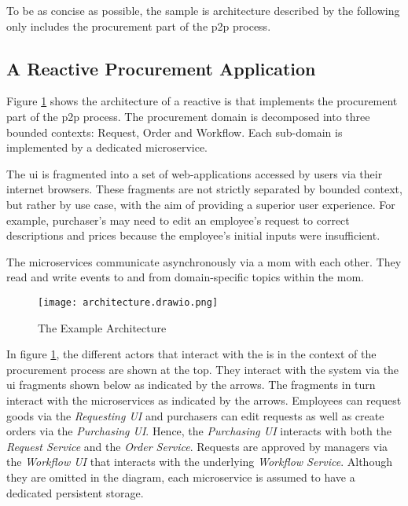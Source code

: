 To be as concise as possible, the sample \gls{is} architecture described by the following only includes the procurement part of the \gls{p2p} process.

\subsection{A Reactive Procurement Application}

Figure \ref{fig:example-architecture} shows the architecture of a reactive \gls{is} that implements the procurement part of the \gls{p2p} process.
The procurement domain is decomposed into three bounded contexts: Request, Order and Workflow.
Each sub-domain is implemented by a dedicated microservice.

The \gls{ui} is fragmented into a set of web-applications accessed by users via their internet browsers.
These fragments are not strictly separated by bounded context, but rather by use case, with the aim of providing a superior user experience.
For example, purchaser's may need to edit an employee's request to correct descriptions and prices because the employee's initial inputs were insufficient.

The microservices communicate asynchronously via a \gls{mom} with each other.
They read and write events to and from domain-specific topics within the \gls{mom}.

\begin{figure}[H]
  \centering
  \texttt{[image: architecture.drawio.png]}
  \caption{The Example Architecture}\label{fig:example-architecture}
\end{figure}

In figure \ref{fig:example-architecture}, the different actors that interact with the \gls{is} in the context of the procurement process are shown at the top.
They interact with the system via the \gls{ui} fragments shown below as indicated by the arrows.
The fragments in turn interact with the microservices as indicated by the arrows.
Employees can request goods via the \emph{Requesting UI} and purchasers can edit requests as well as create orders via the \emph{Purchasing UI}.
Hence, the \emph{Purchasing UI} interacts with both the \emph{Request Service} and the \emph{Order Service}.
Requests are approved by managers via the \emph{Workflow UI} that interacts with the underlying \emph{Workflow Service}.
Although they are omitted in the diagram, each microservice is assumed to have a dedicated persistent storage.

